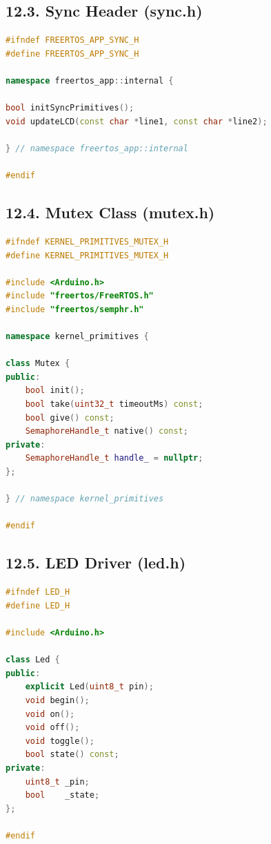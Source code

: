 \documentclass[12pt]{article}
\begin{document}
\subsection*{12.3. Sync Header (sync.h)}

\begin{lstlisting}[language=C++, caption=sync.h – Synchronization Primitives Interface]
#ifndef FREERTOS_APP_SYNC_H
#define FREERTOS_APP_SYNC_H

namespace freertos_app::internal {

bool initSyncPrimitives();
void updateLCD(const char *line1, const char *line2);

} // namespace freertos_app::internal

#endif
\end{lstlisting}

\subsection*{12.4. Mutex Class (mutex.h)}

\begin{lstlisting}[language=C++, caption=mutex.h – FreeRTOS Mutex Wrapper]
#ifndef KERNEL_PRIMITIVES_MUTEX_H
#define KERNEL_PRIMITIVES_MUTEX_H

#include <Arduino.h>
#include "freertos/FreeRTOS.h"
#include "freertos/semphr.h"

namespace kernel_primitives {

class Mutex {
public:
    bool init();
    bool take(uint32_t timeoutMs) const;
    bool give() const;
    SemaphoreHandle_t native() const;
private:
    SemaphoreHandle_t handle_ = nullptr;
};

} // namespace kernel_primitives

#endif
\end{lstlisting}

\subsection*{12.5. LED Driver (led.h)}

\begin{lstlisting}[language=C++, caption=led.h – LED GPIO Driver]
#ifndef LED_H
#define LED_H

#include <Arduino.h>

class Led {
public:
    explicit Led(uint8_t pin);
    void begin();
    void on();
    void off();
    void toggle();
    bool state() const;
private:
    uint8_t _pin;
    bool    _state;
};

#endif
\end{lstlisting}
\end{document}
